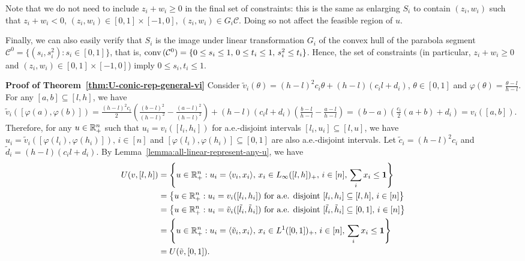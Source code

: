 	Note that we do not need to include $z_i + w_i \geq 0$ in the final set of constraints: this is the same as enlarging $S_i$ to contain $(z_i, w_i)$ such that $z_i + w_i < 0$, $(z_i, w_i)\in [0,1]\times [-1, 0]$, $(z_i, w_i) \in G_i \mathcal{C}$. Doing so not affect the feasible region of $u$.

	Finally, we can also easily verify that $S_i$ is the image under linear transformation $G_i$ of the convex hull of the parabola segment $\mathcal{C}^0 = \{ (s_i, s_i^2): s_i \in [0,1] \}$, that is, 
	$\textnormal{conv}\,(\mathcal{C}^0) = \{ 0\leq s_i \leq 1,\, 0 \leq t_i \leq 1,\, s_i^2 \leq t_i \}$.
	Hence, the set of constraints (in particular, $z_i + w_i \geq 0$ and $(z_i,w_i)\in [0,1] \times [-1,0]$) imply
	$0\leq s_i, t_i \leq 1$.

	\smallskip\noindent\textbf{Proof of Theorem~\ref{thm:U-conic-rep-general-vi}}
Consider $\tilde{v}_i(\theta) = (h-l)^2 c_i \theta + (h-l)(c_i l + d_i)$, $\theta\in [0,1]$ and $\varphi(\theta) = \frac{\theta-l}{h-l}$. For any $[a,b]\subseteq [l,h]$, we have
$
	\tilde{v}_i([\varphi(a), \varphi(b)]) = \frac{(h-l)^2 c_i}{2}\left( \frac{(b-l)^2}{(h-l)^2} - \frac{(a-l)^2}{(h-l)^2} \right) + (h-l)(c_i l + d_i) \left( \frac{b-l}{h-l} - \frac{a-l}{h-l} \right) 
	= (b-a)\left( \frac{c_i}{2}(a+b) + d_i \right) = v_i([a,b])$.
Therefore, for any $u\in \mathbb{R}_+^n$ such that $u_i = v_i([l_i, h_i])$ for a.e.-disjoint intervals $[l_i, u_i]\subseteq [l,u]$, we have 
$u_i = \tilde{v}_i([\varphi(l_i), \varphi(h_i)]),\, i\in [n]$
and $[\varphi(l_i), \varphi(h_i) ]\subseteq [0,1]$ are also a.e.-disjoint intervals. Let $\tilde{c}_i = (h-l)^2 c_i$ and $\tilde{d}_i = (h-l)(c_i l + d_i)$. By Lemma~\ref{lemma:all-linear-represent-any-u}, we have
\begin{align*}
	U(v, [l,h])
	&= \left\{ u\in \mathbb{R}_+^n: u_i = \langle v_i, x_i \rangle,\, x_i \in L_{\infty}([l,h])_+,\, i\in [n],\, \sum_i x_i \leq \mathbf{1} \right\} \\
	&= \left\{ u\in \mathbb{R}_+^n: \text{$u_i = v_i([l_i, h_i])$ for a.e. disjoint $[l_i, h_i]\subseteq [l,h]$, $i\in [n]$} \right\} \\
	& = \left\{ u\in \mathbb{R}_+^n: \text{$u_i = \tilde{v}_i([\tilde{l}_i, \tilde{h}_i])$ for a.e. disjoint $[\tilde{l}_i, \tilde{h}_i]\subseteq [0,1]$, $i\in [n]$} \right\} \\
	& = \left\{ u\in \mathbb{R}_+^n: u_i = \langle \tilde{v}_i, x_i \rangle,\, x_i \in L^1([0,1])_+,\, i\in [n],\, \sum_i x_i \leq \mathbf{1} \right\}\\
	& = U(\tilde{v}, [0,1]).
\end{align*}
